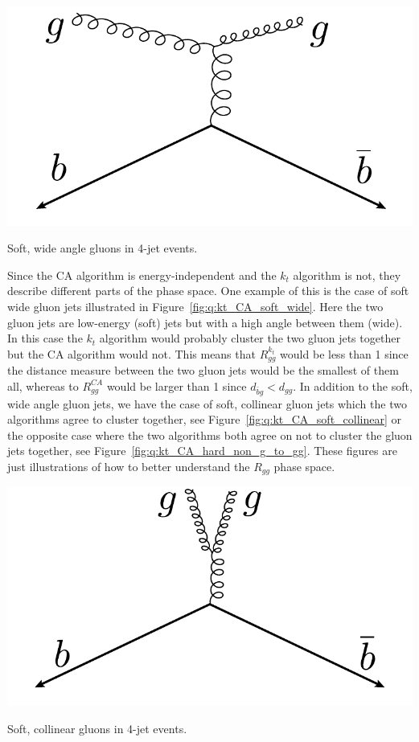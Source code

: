 \begin{marginfigure}
  \centerfloat
  \includegraphics[width=1.1\textwidth]{figures/R_kt_CA/soft_wide_angle.pdf}
  \caption[Soft Wide Angle Gluons in 4-Jet Events]
          {Soft, wide angle gluons in 4-jet events.} 
  \label{fig:q:kt_CA_soft_wide}
\end{marginfigure}

Since the CA algorithm is energy-independent and the $k_t$ algorithm is not, they describe different parts of the phase space. One example of this is the case of soft wide gluon jets illustrated in Figure~\ref{fig:q:kt_CA_soft_wide}. Here the two gluon jets are low-energy (soft) jets but with a high angle between them (wide). In this case the $k_t$ algorithm would probably cluster the two gluon jets together but the CA algorithm would not. This means that $R_{gg}^{k_t}$ would be less than \num{1} since the distance measure between the two gluon jets would be the smallest of them all, whereas to $R_{gg}^{CA}$ would be larger than \num{1} since $d_{\bar{b}g} < d_{gg}$. In addition to the soft, wide angle gluon jets, we have the case of soft, collinear gluon jets which the two algorithms agree to cluster together, see Figure~\ref{fig:q:kt_CA_soft_collinear} or the opposite case where the two algorithms both agree on not to cluster the gluon jets together, see Figure~\ref{fig:q:kt_CA_hard_non_g_to_gg}. These figures are just illustrations of how to better understand the $R_{gg}$ phase space.

\begin{marginfigure}[-4cm]
  \centerfloat
  \includegraphics[width=1.1\textwidth]{figures/R_kt_CA/soft_collinear.pdf}
  \caption[Soft Collinear Gluons in 4-Jet Events]
          {Soft, collinear gluons in 4-jet events.} 
  \label{fig:q:kt_CA_soft_collinear}
\end{marginfigure}

